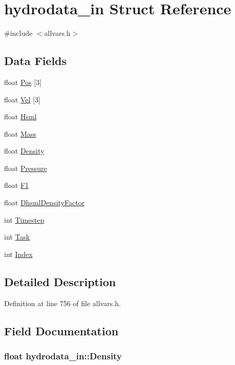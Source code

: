 \hypertarget{structhydrodata__in}{
\section{hydrodata\_\-in Struct Reference}
\label{structhydrodata__in}
}


{\ttfamily \#include $<$allvars.h$>$}

\subsection*{Data Fields}
\begin{DoxyCompactItemize}
\item 
float \hyperlink{structhydrodata__in_af50edb8226de4bdcdbcc0f2679cc694d}{Pos} \mbox{[}3\mbox{]}
\item 
float \hyperlink{structhydrodata__in_aac935e4620b7700cae000a32a2922df4}{Vel} \mbox{[}3\mbox{]}
\item 
float \hyperlink{structhydrodata__in_ae24f9ceb40451913af1ab6e793772bdd}{Hsml}
\item 
float \hyperlink{structhydrodata__in_a5fb05f5111cc5541a5f2d9ad647b0665}{Mass}
\item 
float \hyperlink{structhydrodata__in_ac408286b56271e4e30f8c149a812948c}{Density}
\item 
float \hyperlink{structhydrodata__in_a95298759ae954d623a92d59f71d318ba}{Pressure}
\item 
float \hyperlink{structhydrodata__in_a2b0cc9653b307eac998cec7175036b20}{F1}
\item 
float \hyperlink{structhydrodata__in_ad2da50b0d4b51a53f9fb5cb4c41f20b8}{DhsmlDensityFactor}
\item 
int \hyperlink{structhydrodata__in_a6b2160624adc7ad0304597845531ffa7}{Timestep}
\item 
int \hyperlink{structhydrodata__in_a7d38ae5b3289a90c4d33add0572942cc}{Task}
\item 
int \hyperlink{structhydrodata__in_a630be87b2fd46a0e22f57bde1a48e015}{Index}
\end{DoxyCompactItemize}


\subsection{Detailed Description}


Definition at line 756 of file allvars.h.



\subsection{Field Documentation}
\hypertarget{structhydrodata__in_ac408286b56271e4e30f8c149a812948c}{
\subsubsection[{Density}]{\setlength{\rightskip}{0pt plus 5cm}float {\bf hydrodata\_\-in::Density}}}
\label{structhydrodata__in_ac408286b56271e4e30f8c149a812948c}


